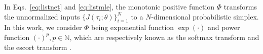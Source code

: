 In Eqs.~\eqref{eq:listnet} and \eqref{eq:listmle}, the monotonic positive function $\Phi$ transforms the unnormalized inputs $\{J(\tau_i; \theta)\}_{i=1}^{N}$ to a $N$-dimensional probabilistic simplex.
In this work, we consider $\Phi$ being exponential function $\exp(\cdot)$ and power function $(\cdot)^p, p\in \mathbb{N}$, which are respectively known as the softmax transform and the escort transform \citep{escort2020}.

\vspace{-.4em}
